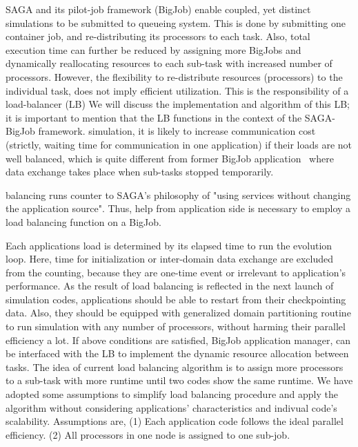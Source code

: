 \documentclass[conference,final]{IEEEtran}
\begin{document}
SAGA and its pilot-job framework (BigJob) enable coupled, yet distinct simulations to be
submitted to queueing system. This is done by submitting one container job, and 
re-distributing its processors to each task. Also, total execution time can further be 
reduced by assigning more BigJobs and dynamically reallocating resources to each sub-task 
with increased number of processors.
However, the flexibility to re-distribute resources (processors) to the individual task, 
does
not imply efficient utilization. This is the responsibility of a load-balancer (LB)
We will discuss the implementation and algorithm of this LB; it is important
to mention that the LB functions in the context of the SAGA-BigJob framework.
simulation, it is likely to increase communication cost (strictly, waiting time for 
communication in one application) if their loads are not well balanced, which is quite 
different from former BigJob application~\cite{Jha:2009} where data exchange takes place 
when sub-tasks stopped temporarily.

balancing runs counter to SAGA's philosophy of "using services without changing the 
application source". Thus, help from application side is necessary to employ a load 
balancing function on a BigJob.

Each applications load is determined by its elapsed time to run the evolution loop. Here, 
time for initialization or inter-domain data exchange are excluded from the counting, 
because they are one-time event or irrelevant to application's performance. As the result 
of load balancing is reflected in the next launch of simulation codes, applications 
should be able to restart from their checkpointing data. Also, they should be equipped 
with generalized domain partitioning routine to run simulation with any number of 
processors, without harming their parallel efficiency a lot. If above conditions are 
satisfied, BigJob application manager,
can be interfaced with the LB to implement the dynamic resource allocation between tasks.
The idea of current load balancing algorithm is to assign more processors to a sub-task 
with more runtime until two codes show the same runtime. We have adopted some assumptions 
to simplify load balancing procedure and apply the algorithm without considering 
applications' characteristics and indivual code's scalability. Assumptions are, (1) Each 
application code follows the ideal parallel efficiency.
(2) All processors in one node is assigned to one sub-job.
\end{document}
